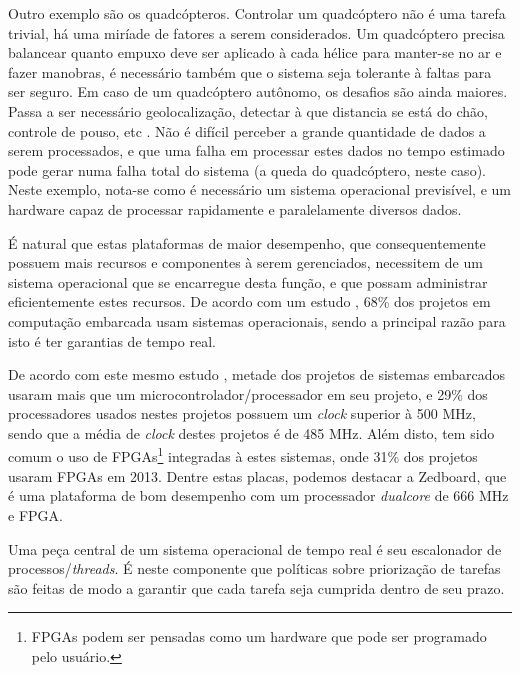 Outro exemplo são os quadcópteros. Controlar um quadcóptero não é uma tarefa trivial, há uma miríade de fatores a serem considerados. Um quadcóptero precisa balancear quanto empuxo deve ser aplicado à cada hélice para manter-se no ar e fazer manobras, é necessário também que o sistema seja tolerante à faltas para ser seguro. Em caso de um quadcóptero autônomo, os desafios são ainda maiores. Passa a ser necessário geolocalização, detectar à que distancia se está do chão, controle de pouso, etc \cite{leeseshia}.
Não é difícil perceber a grande quantidade de dados a serem processados, e que uma falha em processar estes dados no tempo estimado pode gerar numa falha total do sistema (a queda do quadcóptero, neste caso). Neste exemplo, nota-se como é necessário um sistema operacional previsível, e um hardware capaz de processar rapidamente e paralelamente diversos dados.



É natural que estas plataformas de maior desempenho, que consequentemente possuem mais recursos e componentes à serem gerenciados, necessitem de um sistema operacional que se encarregue desta função, e que possam administrar eficientemente estes recursos.
De acordo com um estudo \cite{UBM}, 68\% dos projetos em computação embarcada usam sistemas operacionais, sendo a principal razão para isto é ter garantias de tempo real.

De acordo com este mesmo estudo \cite{UBM}, metade dos projetos de sistemas embarcados usaram mais que um microcontrolador/processador em seu projeto, e 29\% dos processadores usados nestes projetos possuem um \emph{clock} superior à 500 MHz, sendo que a média de \emph{clock} destes projetos é de 485 MHz.
Além disto, tem sido comum o uso de FPGAs\footnote{FPGAs podem ser pensadas como um hardware que pode ser programado pelo usuário.} integradas à estes sistemas, onde 31\% dos projetos usaram FPGAs em 2013.
Dentre estas placas, podemos destacar a Zedboard, que é uma plataforma de bom desempenho com um processador \emph{dualcore} de 666 MHz e FPGA.


Uma peça central de um sistema operacional de tempo real é seu escalonador de processos/\emph{threads}. É neste componente que políticas sobre priorização de tarefas são feitas de modo a garantir que cada tarefa seja cumprida dentro de seu prazo.

